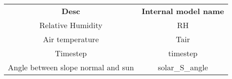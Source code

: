 \documentclass[12pt]{article}
\begin{document}
\begin{center}
\begin{tabular}{c|c}
	\textbf{Desc}  &  \textbf{Internal model name}  \\
	Relative Humidity & RH \\
	Air temperature & Tair \\
	Timestep & timestep \\
	Angle between slope normal and sun & solar_S_angle \\

\end{tabular}
\end{center}

\clearpage


\end{document}
